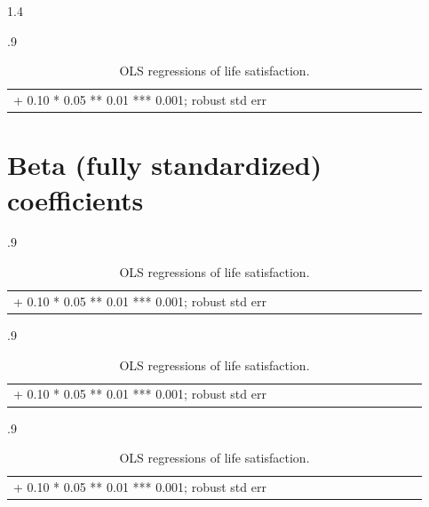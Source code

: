 \documentclass[10pt, letterpaper]{article}
\begin{document}
\begin{spacing}{1.4}
\begin{spacing}{.9} \begin{table}[H]\centering   \begin{scriptsize} \begin{tabular}{p{1.8in}p{.5in}p{.5in}p{.5in}p{.5in}p{.5in}p{.5in}p{.5in}p{.5in}p{.5in}p{.5 in}p{.5in}p{.5 in}}\hline  \hline + 0.10 * 0.05 ** 0.01 *** 0.001; robust std err \end{tabular}\end{scriptsize}\caption{\label{regD2}OLS regressions of life satisfaction.}\end{table} \end{spacing}



\section{Beta (fully standardized) coefficients}



\begin{spacing}{.9} \begin{table}[H]\centering   \begin{scriptsize} \begin{tabular}{p{1.8in}p{.5in}p{.5in}p{.5in}p{.5in}p{.5in}p{.5in}p{.5in}p{.5in}p{.5in}p{.5 in}p{.5in}p{.5 in}}\hline  \hline + 0.10 * 0.05 ** 0.01 *** 0.001; robust std err \end{tabular}\end{scriptsize}\caption{\label{regAA}OLS regressions of life satisfaction.}\end{table} \end{spacing}

\begin{spacing}{.9} \begin{table}[H]\centering   \begin{scriptsize} \begin{tabular}{p{1.8in}p{.5in}p{.5in}p{.5in}p{.5in}p{.5in}p{.5in}p{.5in}p{.5in}p{.5in}p{.5 in}p{.5in}p{.5 in}}\hline  \hline + 0.10 * 0.05 ** 0.01 *** 0.001; robust std err \end{tabular}\end{scriptsize}\caption{\label{regBB}OLS regressions of life satisfaction.}\end{table} \end{spacing}

\begin{spacing}{.9} \begin{table}[H]\centering   \begin{scriptsize} \begin{tabular}{p{1.8in}p{.5in}p{.5in}p{.5in}p{.5in}p{.5in}p{.5in}p{.5in}p{.5in}p{.5in}p{.5 in}p{.5in}p{.5 in}}\hline  \hline + 0.10 * 0.05 ** 0.01 *** 0.001; robust std err \end{tabular}\end{scriptsize}\caption{\label{regCC}OLS regressions of life satisfaction.}\end{table} \end{spacing}


\end{spacing}
\end{document}

